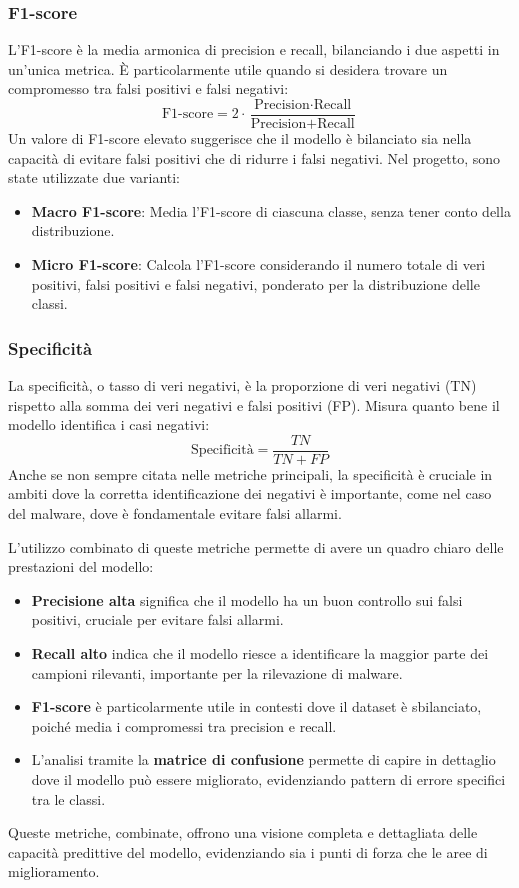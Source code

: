 \subsubsection{F1-score}
L'F1-score è la media armonica di precision e recall, bilanciando i due aspetti in un'unica metrica. È particolarmente utile quando si desidera trovare un compromesso tra falsi positivi e falsi negativi:
\[
\text{F1-score} = 2 \cdot \frac{\text{Precision} \cdot \text{Recall}}{\text{Precision} + \text{Recall}}
\]
Un valore di F1-score elevato suggerisce che il modello è bilanciato sia nella capacità di evitare falsi positivi che di ridurre i falsi negativi. Nel progetto, sono state utilizzate due varianti:
\begin{itemize}
    \item \textbf{Macro F1-score}: Media l'F1-score di ciascuna classe, senza tener conto della distribuzione.
    \item \textbf{Micro F1-score}: Calcola l'F1-score considerando il numero totale di veri positivi, falsi positivi e falsi negativi, ponderato per la distribuzione delle classi.
\end{itemize}

\subsubsection{Specificità}
La specificità, o tasso di veri negativi, è la proporzione di veri negativi (TN) rispetto alla somma dei veri negativi e falsi positivi (FP). Misura quanto bene il modello identifica i casi negativi:
\[
\text{Specificità} = \frac{TN}{TN + FP}
\]
Anche se non sempre citata nelle metriche principali, la specificità è cruciale in ambiti dove la corretta identificazione dei negativi è importante, come nel caso del malware, dove è fondamentale evitare falsi allarmi.

L'utilizzo combinato di queste metriche permette di avere un quadro chiaro delle prestazioni del modello:
\begin{itemize}
    \item \textbf{Precisione alta} significa che il modello ha un buon controllo sui falsi positivi, cruciale per evitare falsi allarmi.
    \item \textbf{Recall alto} indica che il modello riesce a identificare la maggior parte dei campioni rilevanti, importante per la rilevazione di malware.
    \item \textbf{F1-score} è particolarmente utile in contesti dove il dataset è sbilanciato, poiché media i compromessi tra precision e recall.
    \item L'analisi tramite la \textbf{matrice di confusione} permette di capire in dettaglio dove il modello può essere migliorato, evidenziando pattern di errore specifici tra le classi.
\end{itemize}
Queste metriche, combinate, offrono una visione completa e dettagliata delle capacità predittive del modello, evidenziando sia i punti di forza che le aree di miglioramento.

